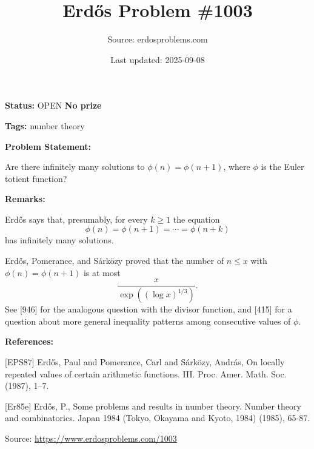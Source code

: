 \documentclass{article}
\title{Erd\H{o}s Problem \#1003}
\date{Last updated: 2025-09-08}
\author{Source: erdosproblems.com}
\begin{document}
\maketitle

\noindent\textbf{Status:} OPEN \quad \textbf{No prize}

\noindent\textbf{Tags:} number theory

\medskip
\noindent\textbf{Problem Statement:}

Are there infinitely many solutions to $\phi(n)=\phi(n+1)$, where $\phi$ is the Euler totient function?

\bigskip
\noindent\textbf{Remarks:}

Erd\H{o}s \cite{Er85e} says that, presumably, for every $k\geq 1$ the equation\[\phi(n)=\phi(n+1)=\cdots=\phi(n+k)\]has infinitely many solutions. 

Erd\H{o}s, Pomerance, and S\'{a}rk\"{o}zy \cite{EPS87} proved that the number of $n\leq x$ with $\phi(n)=\phi(n+1)$ is at most\[\frac{x}{\exp((\log x)^{1/3})}.\]See [946] for the analogous question with the divisor function, and [415] for a question about more general inequality patterns among consecutive values of $\phi$.

\bigskip
\noindent\textbf{References:}

[EPS87] Erd\H{o}s, Paul and Pomerance, Carl and S\'{a}rk\"ozy, Andr\'{a}s, On locally repeated values of certain arithmetic functions.
{III}. Proc. Amer. Math. Soc. (1987), 1--7.
 
 [Er85e] Erd\H{o}s, P., Some problems and results in number theory. Number theory and combinatorics. Japan 1984 (Tokyo,
Okayama and Kyoto, 1984) (1985), 65-87.

\bigskip
\noindent\small{Source: \url{https://www.erdosproblems.com/1003}}
\end{document}
